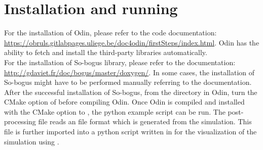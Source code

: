 \section{Installation and running}
For the installation of Odin, please refer to the code documentation: \url{https://obruls.gitlabpages.uliege.be/doc4odin/firstSteps/index.html}. Odin has the ability to fetch and install the third-party libraries automatically.\\

For the installation of So-bogus library, please refer to the documentation: \url{http://gdaviet.fr/doc/bogus/master/doxygen/}. In some cases, the installation of So-bogus might have to be performed manually referring to the documentation. After the successful installation of So-bogus, from the  directory in Odin, turn  the CMake option of  before compiling Odin. Once Odin is compiled and installed with the CMake option  to , the python example script can be run. The post-processing file reads an  file format which is generated from the simulation. This  file is further imported into a python script written in  for the visualization of the simulation using .

